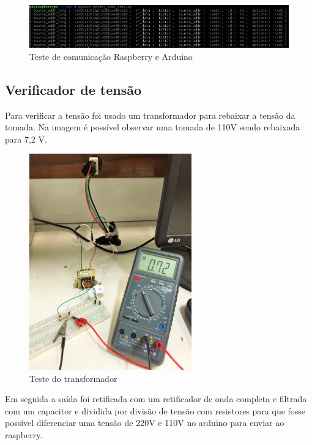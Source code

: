 

\begin{figure}[H]
\centering
\includegraphics[width=1\textwidth]{figuras/teste-inicial-raspberry-arduino.png}
\caption{\label{fig:raspberry-arduino-1} Teste de comunicação Raspberry e Arduino}
\end{figure}

\subsection{Verificador de tensão}

Para verificar a tensão foi usado um transformador para rebaixar a tensão da tomada. Na imagem é possível observar uma tomada de 110V sendo rebaixada para 7,2 V.

\begin{figure}[H]
\centering
\includegraphics[width=7cm,keepaspectratio]{figuras/sensor-tensao.jpg} 
\caption{\label{fig:sensor-tensao} Teste do transformador}
\end{figure}

Em seguida a saída foi retificada com um retificador de onda completa e filtrada com um capacitor e dividida por divisão de tensão com resistores para que fosse possível diferenciar uma tensão de 220V e 110V no arduino para enviar ao raspberry.

